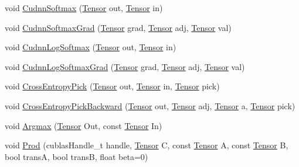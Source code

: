 \begin{DoxyCompactItemize}
\item 
void \hyperlink{namespacemarian_a9edd9deddefcee4caf236da00cebe810}{Cudnn\+Softmax} (\hyperlink{namespacemarian_a88b71ec34bb354564cddc24eb80f7e14}{Tensor} out, \hyperlink{namespacemarian_a88b71ec34bb354564cddc24eb80f7e14}{Tensor} in)
\item 
void \hyperlink{namespacemarian_af0841b9f603922b0ae92f8fd76c1f5e0}{Cudnn\+Softmax\+Grad} (\hyperlink{namespacemarian_a88b71ec34bb354564cddc24eb80f7e14}{Tensor} grad, \hyperlink{namespacemarian_a88b71ec34bb354564cddc24eb80f7e14}{Tensor} adj, \hyperlink{namespacemarian_a88b71ec34bb354564cddc24eb80f7e14}{Tensor} val)
\item 
void \hyperlink{namespacemarian_a658f77291edab2b88417f988781ab07f}{Cudnn\+Log\+Softmax} (\hyperlink{namespacemarian_a88b71ec34bb354564cddc24eb80f7e14}{Tensor} out, \hyperlink{namespacemarian_a88b71ec34bb354564cddc24eb80f7e14}{Tensor} in)
\item 
void \hyperlink{namespacemarian_a6b88b6fa809d1fb3ad2399f4b55dd552}{Cudnn\+Log\+Softmax\+Grad} (\hyperlink{namespacemarian_a88b71ec34bb354564cddc24eb80f7e14}{Tensor} grad, \hyperlink{namespacemarian_a88b71ec34bb354564cddc24eb80f7e14}{Tensor} adj, \hyperlink{namespacemarian_a88b71ec34bb354564cddc24eb80f7e14}{Tensor} val)
\item 
void \hyperlink{namespacemarian_a22ac2bab1004e993e09c272af096cbc3}{Cross\+Entropy\+Pick} (\hyperlink{namespacemarian_a88b71ec34bb354564cddc24eb80f7e14}{Tensor} out, \hyperlink{namespacemarian_a88b71ec34bb354564cddc24eb80f7e14}{Tensor} in, \hyperlink{namespacemarian_a88b71ec34bb354564cddc24eb80f7e14}{Tensor} pick)
\item 
void \hyperlink{namespacemarian_ad12afd6fbca17c63f3444bdbd535c146}{Cross\+Entropy\+Pick\+Backward} (\hyperlink{namespacemarian_a88b71ec34bb354564cddc24eb80f7e14}{Tensor} out, \hyperlink{namespacemarian_a88b71ec34bb354564cddc24eb80f7e14}{Tensor} adj, \hyperlink{namespacemarian_a88b71ec34bb354564cddc24eb80f7e14}{Tensor} a, \hyperlink{namespacemarian_a88b71ec34bb354564cddc24eb80f7e14}{Tensor} pick)
\item 
void \hyperlink{namespacemarian_a64116355f8cb16a51c1408df4a3b2b28}{Argmax} (\hyperlink{namespacemarian_a88b71ec34bb354564cddc24eb80f7e14}{Tensor} Out, const \hyperlink{namespacemarian_a88b71ec34bb354564cddc24eb80f7e14}{Tensor} In)
\item 
void \hyperlink{namespacemarian_a509f2975b7c8da70df1cd56de5d3e79e}{Prod} (cublas\+Handle\+\_\+t handle, \hyperlink{namespacemarian_a88b71ec34bb354564cddc24eb80f7e14}{Tensor} C, const \hyperlink{namespacemarian_a88b71ec34bb354564cddc24eb80f7e14}{Tensor} A, const \hyperlink{namespacemarian_a88b71ec34bb354564cddc24eb80f7e14}{Tensor} B, bool transA, bool transB, float beta=0)

\end{DoxyCompactItemize}
